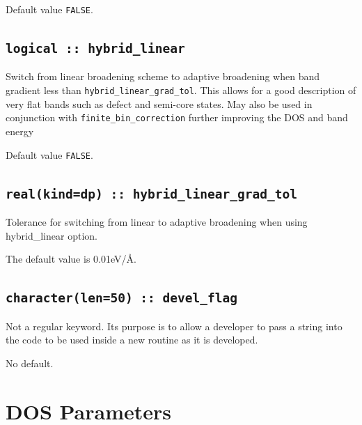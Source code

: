 \documentclass[a4paper,11pt,twoside]{book}
\begin{document}
Default value \verb#FALSE#.

\subsection[hybrid\_linear]{\tt logical :: hybrid\_linear}
Switch from linear broadening scheme to adaptive broadening when band gradient less than \verb#hybrid_linear_grad_tol#. 
This allows for a good description of very flat bands such as defect and semi-core states. May also be used in conjunction 
with \verb#finite_bin_correction# further improving the DOS and band energy

Default value \verb#FALSE#.

\subsection[hybrid\_linear\_grad\_tol]{\tt real(kind=dp) :: hybrid\_linear\_grad\_tol}
Tolerance for switching from linear to adaptive broadening when using hybrid\_linear option.

The default value is 0.01eV/\AA.


\subsection[devel\_flag]{\tt character(len=50) :: devel\_flag}

Not a regular keyword. Its purpose is to allow a developer to pass a
string into the code to be used inside a new routine as it is developed.

No default.



\section{DOS Parameters}
\end{document}
